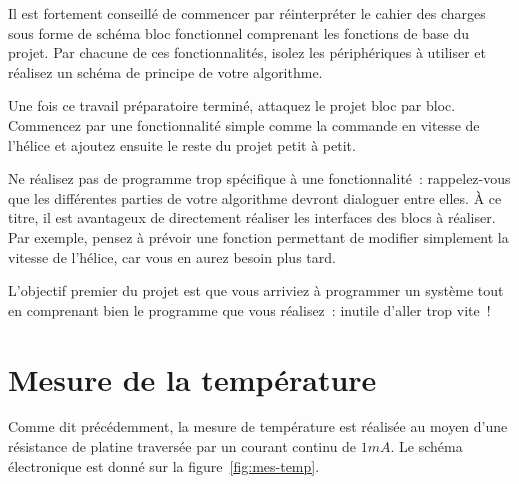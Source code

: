 \documentclass[11pt,a4paper]{article}
\theoremstyle{definition}%
\begin{document}
Il est fortement conseillé de commencer par réinterpréter le cahier des charges sous forme de schéma bloc fonctionnel comprenant les fonctions de base du projet.
Par chacune de ces fonctionnalités, isolez les périphériques à utiliser et réalisez un schéma de principe de votre algorithme.

Une fois ce travail préparatoire terminé, attaquez le projet bloc par bloc.
Commencez par une fonctionnalité simple comme la commande en vitesse de l’hélice et ajoutez ensuite le reste du projet petit à petit.

Ne réalisez pas de programme trop spécifique à une fonctionnalité~: rappelez-vous que les différentes parties de votre algorithme devront dialoguer entre elles.
À ce titre, il est avantageux de directement réaliser les interfaces des blocs à réaliser.
Par exemple, pensez à prévoir une fonction permettant de modifier simplement la vitesse de l’hélice, car vous en aurez besoin plus tard.

L’objectif premier du projet est que vous arriviez à programmer un système tout en comprenant bien le programme que vous réalisez~: inutile d’aller trop vite~!







\section{Mesure de la température}
Comme dit précédemment, la mesure de température est réalisée au moyen d’une résistance de platine traversée par un courant continu de $1 mA$.
Le schéma électronique est donné sur la figure~\ref{fig:mes-temp}.
\end{document}
